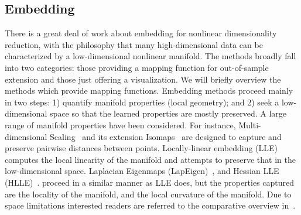\documentclass[10pt,twocolumn,letterpaper]{article}
\begin{document}





\subsection{Embedding}
There is a great deal of work about embedding for nonlinear
dimensionality reduction, with the philosophy that many
high-dimensional data can be characterized by a low-dimensional
nonlinear manifold. The methods broadly fall into two categories:
those providing a mapping function for out-of-sample extension and 
those just offering a visualization. We will briefly overview the 
methods which provide mapping functions. Embedding methods proceed 
mainly in two steps: 1) quantify manifold properties (local geometry); 
and 2) seek a low-dimensional space so that the learned properties 
are mostly preserved. A large range of manifold properties have been
considered. For instance, Multi-dimensional
Scaling~\cite{MDScaling:08} and its extension Isomaps~\cite{isomap:00}
are designed to capture and preserve pairwise distances between
points. Locally-linear embedding (LLE)~\cite{lle:science00,
  NPEmbedding:iccv05} computes the local linearity of the
manifold and attempts to preserve that in the low-dimensional space.
Laplacian Eigenmaps (LapEigen)~\cite{eigenmaps:nips01}, and Hessian LLE
(HLLE)~\cite{hlle}. %
proceed in a similar manner as LLE does, but the
properties captured are the locality of the manifold, and the local 
curvature of the manifold.
Due to space limitations interested readers are referred to the
comparative overview in~\cite{embedding:overview:09}.
\end{document}

